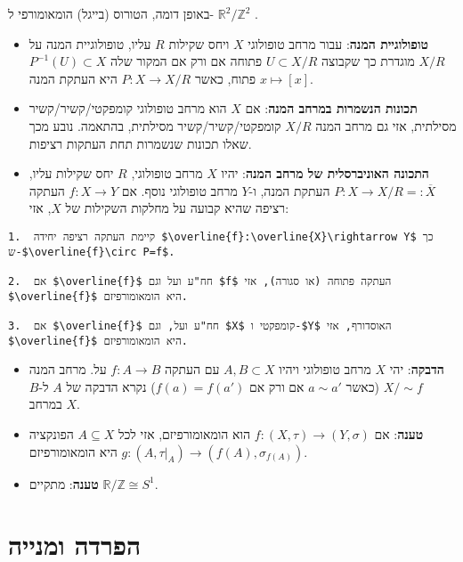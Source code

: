 \documentclass{tstextbook}
\begin{document}
\begin{remark}
באופן דומה, הטורוס (בייגל) הומאומורפי ל- \(\mathbb{R}^{2}/\mathbb{Z}^{2}\) .

\end{remark}
\begin{summary}
  \begin{itemize}
    \item \textbf{טופולוגיית המנה}: עבור מרחב טופולוגי \(X\) ויחס שקילות \(R\) עליו, טופולוגיית המנה על \(X/R\) מוגדרת כך שקבוצה \(U\subset X/R\) פתוחה אם ורק אם המקור שלה \(P^{-1}(U)\subset X\) פתוח, כאשר \(P:X\rightarrow X/R\) היא העתקת המנה \(x\mapsto[x]\).
    \item \textbf{תכונות הנשמרות במרחב המנה}: אם \(X\) הוא מרחב טופולוגי קומפקטי/קשיר/קשיר מסילתית, אזי גם מרחב המנה \(X/R\) קומפקטי/קשיר/קשיר מסילתית, בהתאמה. נובע מכך שאלו תכונות שנשמרות תחת העתקות רציפות.
    \item \textbf{התכונה האוניברסלית של מרחב המנה}: יהיו \(X\) מרחב טופולוגי, \(R\) יחס שקילות עליו, \(P:X\rightarrow X/R=:\overline{X}\) העתקת המנה, ו-\(Y\) מרחב טופולוגי נוסף. אם \(f:X\rightarrow Y\) העתקה רציפה שהיא קבועה על מחלקות השקילות של \(X\), אזי:
  \end{itemize}
\end{summary}
\begin{verbatim}
1.  קיימת העתקה רציפה יחידה $\overline{f}:\overline{X}\rightarrow Y$ כך ש-$\overline{f}\circ P=f$.

2.  אם $\overline{f}$ חח"ע ועל וגם $f$ העתקה פתוחה (או סגורה), אזי $\overline{f}$ היא הומאומורפיזם.

3.  אם $\overline{f}$ חח"ע ועל, וגם $X$ קומפקטי ו-$Y$ האוסדורף, אזי $\overline{f}$ היא הומאומורפיזם.

\end{verbatim}
\begin{itemize}
  \item \textbf{הדבקה}: יהי \(X\) מרחב טופולוגי ויהיו \(A,B\subset X\) עם העתקה \(f:A\rightarrow B\) על. מרחב המנה \(X/\sim f\) (כאשר \(a\sim a'\) אם ורק אם \(f(a)=f(a')\)) נקרא הדבקה של \(A\) ל-\(B\) במרחב \(X\).
  \item \textbf{טענה}: אם \(f:(X,\tau)\to (Y,\sigma)\) הוא הומאומורפיזם, אזי לכל \(A\subseteq X\) הפונקציה \(g:(A,\tau|_{A})\to(f(A),\sigma_{f(A)})\) היא הומאומורפיזם.
  \item \textbf{טענה}: מתקיים \(\mathbb{R}/\mathbb{Z}\cong S^{1}\).
\end{itemize}
\chapter{הפרדה ומנייה}
\end{document}
